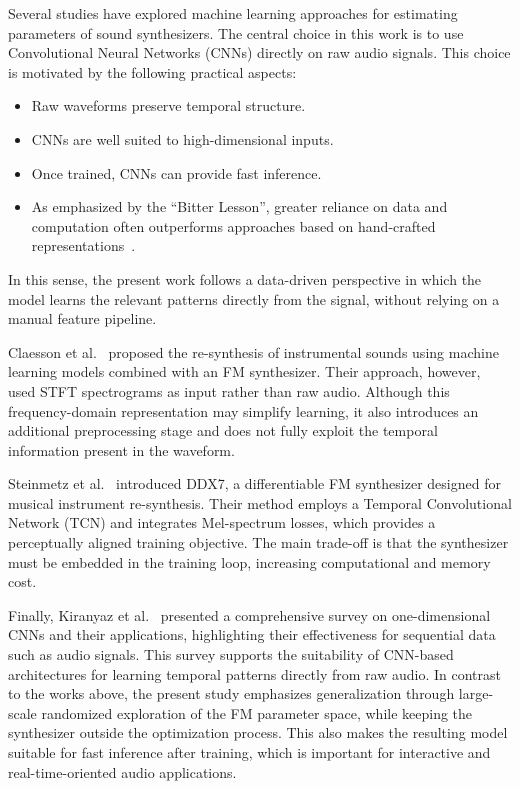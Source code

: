 Several studies have explored machine learning approaches for estimating parameters of sound synthesizers. The central choice in this work is to use Convolutional Neural Networks (CNNs) directly on raw audio signals. This choice is motivated by the following practical aspects:

\begin{itemize}
    \item Raw waveforms preserve temporal structure.
    \item CNNs are well suited to high-dimensional inputs.
    \item Once trained, CNNs can provide fast inference.
    \item As emphasized by the ``Bitter Lesson'', greater reliance on data and computation often outperforms approaches based on hand-crafted representations~\cite{sutton2019bitterlesson}.
\end{itemize}

In this sense, the present work follows a data-driven perspective in which the model learns the relevant patterns directly from the signal, without relying on a manual feature pipeline.

Claesson et al.~\cite{claesson2021resynthesis} proposed the re-synthesis of instrumental sounds using machine learning models combined with an FM synthesizer. Their approach, however, used STFT spectrograms as input rather than raw audio. Although this frequency-domain representation may simplify learning, it also introduces an additional preprocessing stage and does not fully exploit the temporal information present in the waveform.

Steinmetz et al.~\cite{steinmetz2022ddx7} introduced DDX7, a differentiable FM synthesizer designed for musical instrument re-synthesis. Their method employs a Temporal Convolutional Network (TCN) and integrates Mel-spectrum losses, which provides a perceptually aligned training objective. The main trade-off is that the synthesizer must be embedded in the training loop, increasing computational and memory cost.

Finally, Kiranyaz et al.~\cite{kiranyaz2021survey} presented a comprehensive survey on one-dimensional CNNs and their applications, highlighting their effectiveness for sequential data such as audio signals. This survey supports the suitability of CNN-based architectures for learning temporal patterns directly from raw audio. In contrast to the works above, the present study emphasizes generalization through large-scale randomized exploration of the FM parameter space, while keeping the synthesizer outside the optimization process. This also makes the resulting model suitable for fast inference after training, which is important for interactive and real-time-oriented audio applications.
